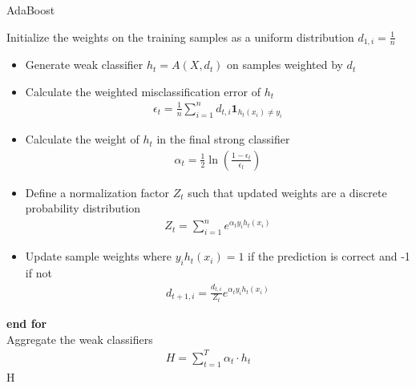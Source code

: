 \documentclass[12pt, reqno]{amsart}
\begin{document}
\begin{algorithm}[H]
    \caption*{AdaBoost}
    \begin{algorithmic}
        \State Initialize the weights on the training samples as a uniform distribution $d_{1, i} = \frac{1}{n}$ \\
            \begin{itemize}
                \item Generate weak classifier $h_t = A(X, d_t)$ on samples weighted by $d_t$

                \item Calculate the weighted misclassification error of $h_t$
                \begin{align*}
                    \epsilon_t = \frac{1}{n} \sum_{i=1}^{n} d_{t, i} \mathbf{1}_{h_t(x_i) \neq y_i}
                \end{align*}

                \item Calculate the weight of $h_t$ in the final strong classifier
                \begin{align*}
                    \alpha_t = \frac{1}{2} \ln \left(\frac{1 - \epsilon_t}{\epsilon_t}\right)
                \end{align*}

                \item Define a normalization factor $Z_t$ such that updated weights are a discrete probability distribution
                \begin{align*}
                    Z_t = \sum_{i=1}^{n} e^{\alpha_t y_i h_t(x_i)}
                \end{align*}

                \item Update sample weights where $y_i h_t(x_i) = 1$ if the prediction is correct and -1 if not
                \begin{align*}
                    d_{t+1, i} = \frac{d_{t, i}}{Z_t} e^{\alpha_t y_i h_t(x_i)}
                \end{align*}
            \end{itemize}
        \EndFor
        \State \textbf{end for} \\
        \State Aggregate the weak classifiers
        \begin{align*}
            H = \sum_{t=1}^{T} \alpha_t \cdot h_t
        \end{align*}
        \State \Return H 
    \end{algorithmic}
\end{algorithm}
\end{document}
